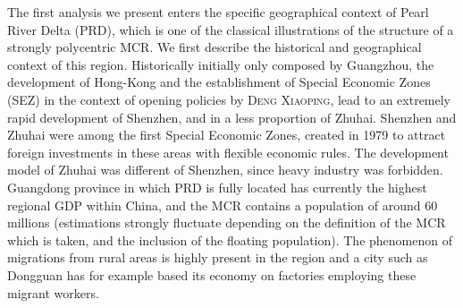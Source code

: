 \documentclass[11pt]{article}
\newcommand{\noun}[1]{\textsc{#1}}
\begin{document}
The first analysis we present enters the specific geographical context of Pearl River Delta (PRD), which is one of the classical illustrations of the structure of a strongly polycentric MCR. We first describe the historical and geographical context of this region. Historically initially only composed by Guangzhou, the development of Hong-Kong and the establishment of Special Economic Zones (SEZ) in the context of opening policies by \noun{Deng Xiaoping}, lead to an extremely rapid development of Shenzhen, and in a less proportion of Zhuhai. Shenzhen and Zhuhai were among the first Special Economic Zones, created in 1979 to attract foreign investments in these areas with flexible economic rules. The development model of Zhuhai was different of Shenzhen, since heavy industry was forbidden. Guangdong province in which PRD is fully located has currently the highest regional GDP within China, and the MCR contains a population of around 60 millions (estimations strongly fluctuate depending on the definition of the MCR which is taken, and the inclusion of the floating population). The phenomenon of migrations from rural areas is highly present in the region and a city such as Dongguan has for example based its economy on factories employing these migrant workers.
\end{document}
